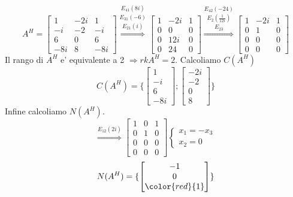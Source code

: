 \documentclass[a4paper, 10pt]{article}
\begin{document}
	 \[ A^H = \begin{bmatrix} 1 & -2i & 1 \\ -i & -2 & -i \\ 6 & 0 & 6 \\ -8i & 8 & -8i \end{bmatrix} 
	   \stackrel{E_{41}(8i)}{\stackrel{E_{31}(-6)}{\stackrel{E_{21}(i)}{\Longrightarrow}}} 
	   \begin{bmatrix} 1 & -2i & 1 \\ 0 & 0 & 0 \\ 0 & 12i & 0 \\ 0 & 24 & 0 \end{bmatrix}
	   \stackrel{E_{42}(-24)}{\stackrel{E_{2}(\frac{1}{12i})}{\stackrel{E_{23}}{\Longrightarrow}}}
	   \begin{bmatrix} 1 & -2i & 1 \\ 0 & 1 & 0 \\ 0 & 0 & 0 \\ 0 & 0 & 0 \end{bmatrix}
	   \]
	  Il rango di $A^H$ e' equivalente a 2 $\Longrightarrow rkA^H = 2$. Calcoliamo $C(A^H)$ 
	  \[ C(A^H) = \lbrace \begin{bmatrix} 1 \\ -i \\ 6 \\ -8i \end{bmatrix} ; 
	  \begin{bmatrix} -2i \\ -2 \\ 0 \\ 8 \end{bmatrix} \rbrace \]
	  Infine calcoliamo $N(A^H)$. 
	  \[ \stackrel{E_{12}(2i)}{\Longrightarrow}\begin{bmatrix}  1 & 0 & 1 \\ 0 & 1 & 0 \\ 0 & 0 & 0 \\ 0 & 0 & 0  \end{bmatrix}
	  \begin{cases} x_1 = -x_3 \\ x_2 = 0 \end{cases} \]
	  \[ N(A^H) = \lbrace \begin{bmatrix} -1 \\ 0 \\ \color{red}{1} \end{bmatrix} \rbrace \]
	  
\end{document}
